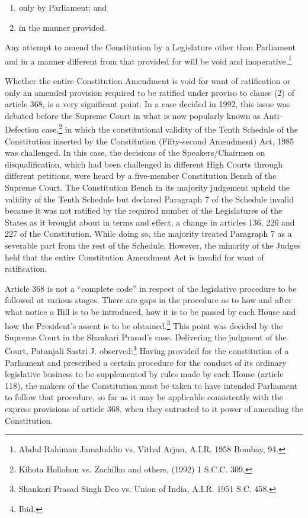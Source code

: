 \begin{multicols}{2}
\begin{enumerate}[label=(\arabic*)]
\item only by Parliament; and

\item  in the manner provided.

\end{enumerate}

\noi
Any attempt to amend the Constitution by a Legislature other than Parliament and in a manner
different from that provided for will be void and inoperative.\footnote{Abdul Rahiman Jamaluddin vs. Vithal Arjun, A.I.R. 1958 Bombay, 94.}

\noi
Whether the entire Constitution Amendment is void for want of ratification or only an
amended provision required to be ratified under proviso to clause (2) of article 368, is a very
significant point. In a case decided in 1992, this issue was debated before the Supreme Court
in what is now popularly known as Anti-Defection case,\footnote{Kihota Hollohon vs. Zachilhu and others, (1992) 1 S.C.C. 309.} in which the constitutional validity of the Tenth Schedule of the Constitution inserted by the Constitution (Fifty-second
Amendment) Act, 1985 was challenged. In this case, the decisions of the Speakers/Chairmen
on disqualification, which had been challenged in different High Courts through different
petitions, were heard by a five-member Constitution Bench of the Supreme Court. The
Constitution Bench in its majority judgement upheld the validity of the Tenth Schedule but
declared Paragraph 7 of the Schedule invalid because it was not ratified by the required
number of the Legislatures of the States as it brought about in terms and effect, a change in
articles 136, 226 and 227 of the Constitution. While doing so, the majority treated Paragraph 7 as a severable part from the rest of the Schedule. However, the minority of the Judges held
that the entire Constitution Amendment Act is invalid for want of ratification.


\noi
Article 368 is not a “complete code” in respect of the legislative procedure to be followed at
various stages. There are gaps in the procedure as to how and after what notice a Bill is to be
introduced, how it is to be passed by each House and how the President’s assent is to be
obtained.\footnote{Shankari Prasad Singh Deo vs. Union of India, A.I.R. 1951 S.C. 458.} This point was decided by the Supreme Court in the Shankari Prasad’s case. Delivering the judgment of the Court, Patanjali Sastri J. observed:\footnote{Ibid.} Having provided for the constitution of a Parliament and prescribed a certain procedure for the conduct of its ordinary
legislative business to be supplemented by rules made by each House (article 118), the makers
of the Constitution must be taken to have intended Parliament to follow that procedure, so far
as it may be applicable consistently with the express provisions of article 368, when they
entrusted to it power of amending the Constitution.


\end{multicols}
